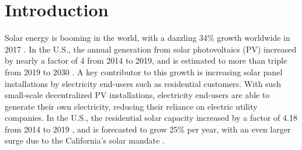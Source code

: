 \documentclass[msom,blindrev]{informs3}
\begin{document}
%


\section{Introduction}

Solar energy is booming in the world, with a dazzling 34\% growth worldwide in 2017 \citep{iea2018snapshot}. In the U.S., the annual generation from solar photovoltaics (PV) increased by nearly a factor of 4 from 2014 to 2019, and is estimated to more than triple from 2019 to 2030 \citep{USEIA-I,USEIA-II}. A key contributor to this growth is increasing solar panel installations by electricity end-users such as residential customers.  With such small-scale decentralized PV installations, electricity end-users are able to generate their own electricity, reducing their reliance on electric utility companies. In the U.S., the residential solar capacity increased by a factor of 4.18 from 2014 to 2019 \citep{USEIA-III}, and is forecasted to grow 25\% per year, with an even larger surge due to the California's solar mandate \citep{weaver_2019,seia,gtmsolar2018}.
\end{document}
